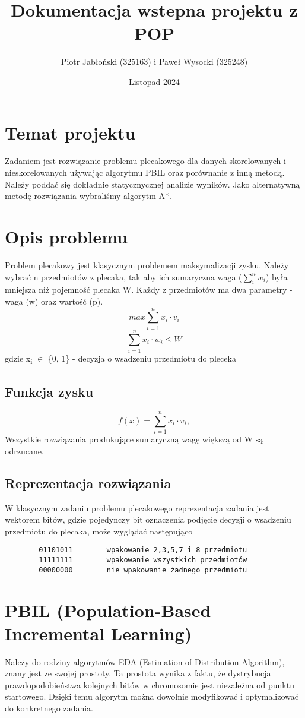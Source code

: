 \documentclass[11pt]{article}
\author{Piotr Jabłoński (325163) i Paweł Wysocki (325248)}
\date{Listopad 2024}
\title{Dokumentacja wstepna projektu z POP}
\begin{document}
\maketitle
\tableofcontents

\pagebreak
\section{Temat projektu}
\label{sec:orge577c5b}
Zadaniem jest rozwiązanie problemu plecakowego dla danych skorelowanych i nieskorelowanych używając algorytmu PBIL oraz porównanie z inną metodą. Należy poddać się dokładnie statycznycznej analizie wyników. Jako alternatywną metodę rozwiązania wybraliśmy algorytm A*.
\section{Opis problemu}
\label{sec:org8993f43}
Problem plecakowy jest klasycznym problemem maksymalizacji zysku. Należy wybrać n przedmiotów z plecaka, tak aby ich sumaryczna waga (\(\sum_i^n{w_i}\)) była mniejsza niż pojemność plecaka W. Każdy z przedmiotów ma dwa parametry - waga (w) oraz wartość (p).
\[
        max \sum_{i=1}^n{x_i \cdot v_i}
\]
\[
        \sum_{i=1}^n{x_i \cdot w_i} \leq W
\]
gdzie x\textsubscript{i} \(\in\) \{0, 1\} - decyzja o wsadzeniu przedmiotu do pleceka
\subsection{Funkcja zysku}
\label{sec:org235d43a}
\[
        f(x) = \sum_{i=1}^n{x_i \cdot v_i},
\]
Wszystkie rozwiązania produkujące sumaryczną wagę większą od W są odrzucane.
\subsection{Reprezentacja rozwiązania}
\label{sec:org357917a}
W klasycznym zadaniu problemu plecakowego reprezentacja zadania jest wektorem bitów, gdzie pojedynczy bit oznaczenia podjęcie decyzji o wsadzeniu przedmiotu do plecaka, może wyglądać następująco
\begin{verbatim}
        01101011        wpakowanie 2,3,5,7 i 8 przedmiotu
        11111111        wpakowanie wszystkich przedmiotów
        00000000        nie wpakowanie żadnego przedmiotu
\end{verbatim}

\pagebreak
\section{PBIL (Population-Based Incremental Learning)}
\label{sec:org20e38e5}
Należy do rodziny algorytmów EDA (Estimation of Distribution Algorithm), znany jest ze swojej prostoty. Ta prostota wynika z faktu, że dystrybucja prawdopodobieństwa kolejnych bitów w chromosomie jest niezależna od punktu startowego. Dzięki temu algorytm można dowolnie modyfikować i optymalizować do konkretnego zadania.
\end{document}
